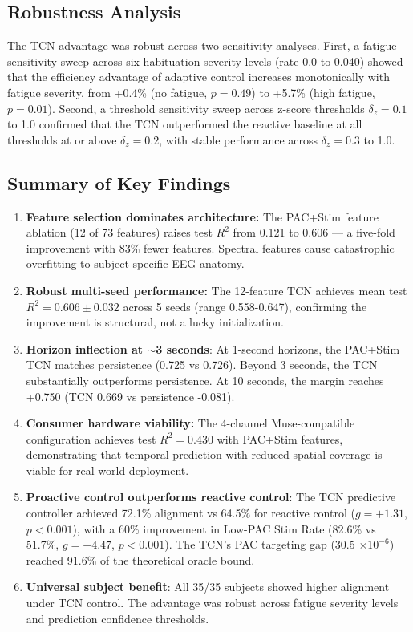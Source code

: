 \documentclass[11pt,letterpaper]{article}
\begin{document}
\subsection{Robustness Analysis}

The TCN advantage was robust across two sensitivity analyses. First, a fatigue sensitivity sweep across six habituation severity levels (rate 0.0 to 0.040) showed that the efficiency advantage of adaptive control increases monotonically with fatigue severity, from +0.4\% (no fatigue, $p=0.49$) to +5.7\% (high fatigue, $p=0.01$). Second, a threshold sensitivity sweep across z-score thresholds $\delta_z=0.1$ to 1.0 confirmed that the TCN outperformed the reactive baseline at all thresholds at or above $\delta_z=0.2$, with stable performance across $\delta_z=0.3$ to 1.0.

\subsection{Summary of Key Findings}

\begin{enumerate}[nosep]
  \item \textbf{Feature selection dominates architecture:} The PAC+Stim feature ablation (12 of 73 features) raises test $R^2$ from 0.121 to 0.606 --- a five-fold improvement with 83\% fewer features. Spectral features cause catastrophic overfitting to subject-specific EEG anatomy.
  \item \textbf{Robust multi-seed performance:} The 12-feature TCN achieves mean test $R^2 = 0.606 \pm 0.032$ across 5 seeds (range 0.558-0.647), confirming the improvement is structural, not a lucky initialization.
  \item \textbf{Horizon inflection at $\sim$3 seconds}: At 1-second horizons, the PAC+Stim TCN matches persistence (0.725 vs 0.726). Beyond 3 seconds, the TCN substantially outperforms persistence. At 10 seconds, the margin reaches +0.750 (TCN 0.669 vs persistence -0.081).
  \item \textbf{Consumer hardware viability:} The 4-channel Muse-compatible configuration achieves test $R^2 = 0.430$ with PAC+Stim features, demonstrating that temporal prediction with reduced spatial coverage is viable for real-world deployment.
  \item \textbf{Proactive control outperforms reactive control}: The TCN predictive controller achieved 72.1\% alignment vs 64.5\% for reactive control ($g = +1.31$, $p < 0.001$), with a 60\% improvement in Low-PAC Stim Rate (82.6\% vs 51.7\%, $g = +4.47$, $p < 0.001$). The TCN's PAC targeting gap (30.5 $\times 10^{-6}$) reached 91.6\% of the theoretical oracle bound.
  \item \textbf{Universal subject benefit}: All 35/35 subjects showed higher alignment under TCN control. The advantage was robust across fatigue severity levels and prediction confidence thresholds.
\end{enumerate}
\end{document}
